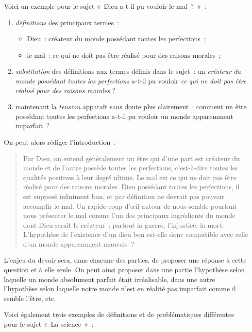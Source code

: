 \documentclass[a4paper]{article}
\begin{document}
Voici un exemple pour le sujet « Dieu a-t-il pu vouloir le mal ? » :

\begin{enumerate}
\item \emph{définitions} des principaux termes :
\begin{itemize}
\item Dieu : créateur du monde possédant toutes les perfections ;
\item le mal : ce qui ne doit pas être réalisé pour des raisons
      morales ;
\end{itemize}
\item \emph{substitution} des définitions aux termes définis dans le sujet : un
   \emph{créateur du monde possédant toutes les perfections} a-t-il pu
   vouloir \emph{ce qui ne doit pas être réalisé pour des raisons morales} ?
\item maintenant la \emph{tension} apparaît sans doute plus clairement : comment
   un être possédant toutes les perfections a-t-il pu vouloir un monde
   apparemment imparfait ?
\end{enumerate}

On peut alors rédiger l'introduction :

\begin{quote}
Par Dieu, on entend généralement un être qui d'une part est créateur
du monde et de l'autre possède toutes les perfections, c'est-à-dire
toutes les qualités positives à leur degré ultime. Le mal est ce qui
ne doit pas être réalisé pour des raisons morales. Dieu possédant
toutes les perfections, il est supposé infiniment bon, et par
définition ne devrait pas pouvoir accomplir le mal. Un rapide coup
d'œil autour de nous semble pourtant nous présenter le mal comme l'un
des principaux ingrédients du monde dont Dieu serait le créateur :
partout la guerre, l'injustice, la mort. L'hypothèse de l'existence
d'un dieu bon est-elle donc compatible avec celle d'un monde
apparemment mauvais ?
\end{quote}

L'enjeu du devoir sera, dans chacune des parties, de proposer une
réponse à cette question et à elle seule. On peut ainsi proposer dans
une partie l'hypothèse selon laquelle un monde absolument parfait était
irréalisable, dans une autre l'hypothèse selon laquelle notre monde
n'est en réalité pas imparfait comme il semble l'être, etc.

Voici également trois exemples de définitions et de problématiques
différentes pour le sujet « La science » :
\end{document}
